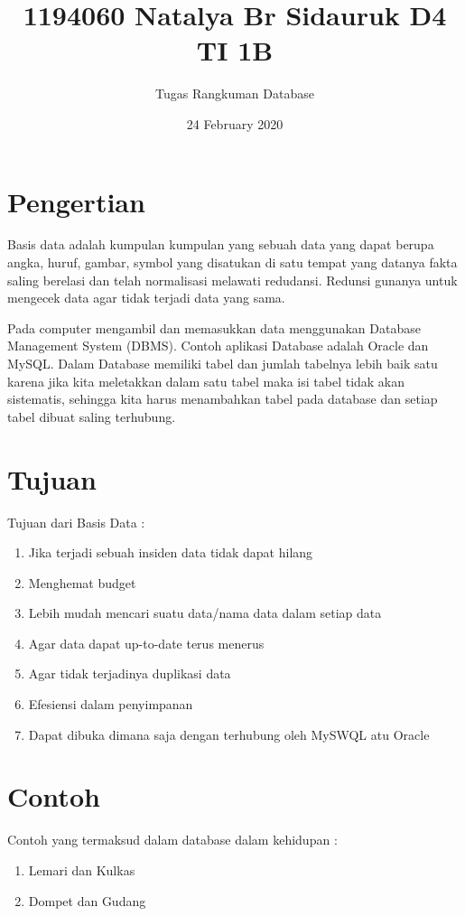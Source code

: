 \documentclass{article}
\title{1194060 Natalya Br Sidauruk D4 TI 1B}
\author{Tugas Rangkuman Database }
\date{24 February 2020}
\begin{document}
\maketitle

\section{ Pengertian }

\indent Basis data adalah kumpulan kumpulan yang sebuah data yang dapat berupa angka, huruf, gambar, symbol yang disatukan di satu tempat yang datanya fakta saling berelasi dan  telah normalisasi melawati redudansi. Redunsi gunanya untuk mengecek data agar tidak terjadi data yang sama. 

\indent Pada computer mengambil dan memasukkan data menggunakan Database Management System (DBMS). Contoh aplikasi Database adalah Oracle dan MySQL. Dalam Database memiliki tabel dan jumlah tabelnya lebih baik satu karena jika kita meletakkan dalam satu tabel maka isi tabel tidak akan sistematis, sehingga kita harus menambahkan tabel pada database dan setiap tabel dibuat saling terhubung.


\section{ Tujuan }
Tujuan dari Basis Data :
\begin{enumerate}
    \item Jika terjadi sebuah insiden data tidak dapat hilang
    \item Menghemat budget
    \item Lebih mudah mencari suatu data/nama data dalam setiap data
    \item Agar data dapat up-to-date terus menerus
    \item Agar tidak terjadinya duplikasi  data
    \item Efesiensi dalam penyimpanan
    \item Dapat dibuka dimana saja dengan terhubung oleh MySWQL atu Oracle
\end{enumerate}

\section { Contoh }
Contoh yang termaksud dalam database dalam kehidupan :
\begin{enumerate}
    \item Lemari dan Kulkas    
    \item Dompet dan Gudang
\end{enumerate}
\end{document}
